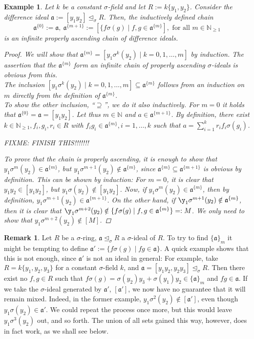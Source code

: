 \documentclass{article}
\def\NE{\mathbb{N}_{\geq1}}
\def\N{\mathbb{N}}
\def\a{\mathfrak{a}}
\def\s{\sigma}
\def\si{\unlhd_{\sigma}}
\def\fa{\text{ for all }}
\newenvironment{bew}{\begin{proof}[Proof]}{\end{proof}}
\theoremstyle{plain}
\newtheorem{ex}[Satz]{Example}
\theoremstyle{definition}
\newtheorem{rem}[Satz]{Remark}
\begin{document}
\begin{ex}\label{nombasisex}
Let $k$ be a constant $\s$-field and let $R:= k\{y_1,y_2\}$. Consider the difference ideal $\a:= [y_1y_2] \si R$. Then, the inductively defined chain $$\a^{\{0\}}:= \a,~ \a^{\{m+1\}}:= [\{ f \s(g) \mid f,g \in \a^{\{m\}}], \fa m \in \NE$$
is an infinite properly ascending chain of difference ideals.
\begin{bew}
We will show that $\a^{\{m\}} = [y_1\s^k(y_2) \mid k = 0,1,\ldots,m]$ by induction. The assertion that the $\a^{\{m\}}$ form an infinite chain of properly ascending $\s$-ideals is obvious from this.\\
The inclusion $ [y_1\s^k(y_2) \mid k = 0,1,\ldots,m] \subseteq \a^{\{m\}}$ follows from an induction on $m$ directly from the definition of $\a^{\{m\}}$. \\ 
 To show the other inclusion, ``$\supseteq$'', we do it also inductively. For $m=0$ it holds that $\a^{\{0\}} = \a = [y_1y_2]$. Let thus $m \in \N$ and $a \in \a^{\{m+1\}}$.
By definition, there exist $k \in \NE, f_i, g_i, r_i \in R$ with $f_ig_i \in \a^{\{m\}}, i = 1,\ldots,k$ such that $a = \sum_{i=1}^k r_i f_i \s(g_i)$. 

FIXME: FINISH THIS!!!!!!!

 To prove that the chain is properly ascending, it is enough to show that $y_1\s^m(y_2) \in \a^{\{m\}}$, but $y_1\s^{m+1}(y_2) \notin \a^{\{m\}}$, since $\a^{\{m\}} \subseteq \a^{\{m+1\}}$ is obvious by definition.
This can be shown by induction: For $m = 0$, it is clear that $y_1y_2 \in [y_1y_2]$, but $y_1 \s(y_2) \notin [y_1y_2]$. Now, if $y_1 \s^m(y_2) \in \a^{\{m\}}$, then by definition, $y_1 \s^{m+1}(y_2) \in \a^{\{m+1\}}$.
On the other hand, if $\y_1 \s^{m+1}(y_2) \notin \a^{\{m\}}$, then it is clear that $\y_1 \s^{m+2}(y_2) \notin \{ f\s(g) \mid f,g \in \a^{\{m\}}\} =: M$. We only need to show that $y_1\s^{m+2}(y_2) \notin [M]$.

\end{bew}
\end{ex}


\begin{rem}\label{remshuffling}
Let $R$ be a $\s$-ring, $\a \si R$ a $\s$-ideal of $R$. To try to find $\{\a\}_m$ it might be tempting to define $\a':= \{ f\s(g) \mid fg \in \a \}$. A quick example shows that this is not enough, since $\a'$ is not an ideal in general: 
For example, take $R=k\{y_1,y_2,y_3\}$ for a constant $\s$-field $k$, and $\a = [y_1y_2, y_2y_3] \si R$. Then there exist no $f,g \in R$ such that $ f \s(g) = \s(y_2)y_3 + \s(y_1)y_2 \in \{\a\}_m$ and $fg \in \a$. 
If we take the $\s$-ideal generated by $\a'$, $[\a']$, we now have no guarantee that it will remain mixed. Indeed, in the former example, $y_1\s^2(y_2) \notin [\a']$, even though $y_1 \s(y_2) \in \a'$. We could repeat the process once more,
 but this would leave $y_1 \s^3(y_2)$ out, and so forth. The union of all sets gained this way, however, does in fact work, as we shall see below.
\end{rem}
\end{document}
